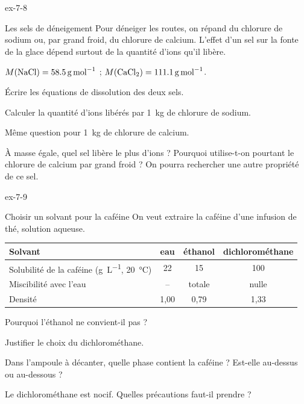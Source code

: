 \begin{blocLivre}{ex-7-8}
\begin{exercice}[2]{Les sels de déneigement}
Pour déneiger les routes, on répand du chlorure de sodium ou, par grand froid, du chlorure de calcium. L'effet d'un sel
sur la fonte de la glace dépend surtout de la quantité d'ions qu'il libère.
\begin{donnees}
$M(\ce{NaCl})=\qty{58,5}{g.mol^{-1}}$ ; $M(\ce{CaCl2})=\qty{111,1}{g.mol^{-1}}$.
\end{donnees}
\begin{questions}
\item Écrire les équations de dissolution des deux sels.
\item Calculer la quantité d'ions libérés par \qty{1}{kg} de chlorure de sodium.
\item Même question pour \qty{1}{kg} de chlorure de calcium.
\item À masse égale, quel sel libère le plus d'ions ? Pourquoi utilise-t-on pourtant le chlorure de calcium par grand
froid ? On pourra rechercher une autre propriété de ce sel.
\end{questions}
\end{exercice}
\end{blocLivre}
\begin{blocLivre}{ex-7-9}
\begin{exercice}[2]{Choisir un solvant pour la caféine}
On veut extraire la caféine d'une infusion de thé, solution aqueuse.
\par\smallskip\noindent\hfill\begin{tabular}{lccc}
\toprule
Solvant & eau & éthanol & dichlorométhane \\
\midrule
Solubilité de la caféine (\unit{g.L^{-1}}, \qty{20}{\degreeCelsius}) & 22 & 15 & 100 \\
Miscibilité avec l'eau & -- & totale & nulle \\
Densité & 1,00 & 0,79 & 1,33 \\
\bottomrule
\end{tabular}\hfill\null\par\smallskip
\begin{questions}
\item Pourquoi l'éthanol ne convient-il pas ?
\item Justifier le choix du dichlorométhane.
\item Dans l'ampoule à décanter, quelle phase contient la caféine ? Est-elle au-dessus ou au-dessous ?
\item Le dichlorométhane est nocif. Quelles précautions faut-il prendre ?
\end{questions}
\end{exercice}
\end{blocLivre}
